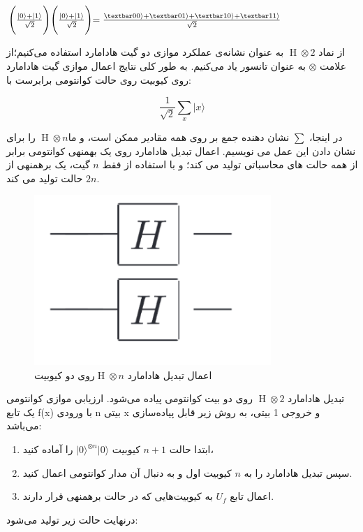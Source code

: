 \documentclass{book}
\begin{document}
\begin{center}
	$ \Biggl( \frac{\vert 0 \rangle + \vert 1 \rangle}{\sqrt{2}}\Biggl)\Biggl( \frac{\vert 0 \rangle + \vert 1 \rangle}{\sqrt{2}}\Biggl) = \frac{\textbar00\rangle + \textbar01\rangle + \textbar10\rangle + \textbar11\rangle}{\sqrt{2}}$

\end{center}

از نماد $\operatorname{H} \otimes 2$ به عنوان نشانه‌ی عملکرد موازی دو گیت هادامارد استفاده می‌کنیم؛از علامت $\otimes$ به عنوان تانسور یاد می‌کنیم. به طور کلی نتایج اعمال موازی گیت هادامارد روی  کیوبیت روی حالت کوانتومی برابرست با:

\begin{center}
	\[\frac{1}{\sqrt{2}} \sum_{x} \vert x \rangle\]
\end{center}


در اینجا، $\sum$ نشان دهنده جمع بر روی همه مقادیر ممکن  است، و ما$\operatorname{H} \otimes n$  را برای نشان دادن این عمل می نویسیم.
اعمال تبدیل هادامارد روی یک بهمنهی کوانتومی برابر از همه حالت های محاسباتی تولید می کند؛ و با استفاده از فقط $n$ گیت، یک برهمنهی از $2n$ حالت تولید می کند.
\begin{center}
	\begin{figure}[ht]
		\centering
		\includegraphics[width=0.8\textwidth]{Multyhadamard.png}
		\caption{اعمال تبدیل هادامارد $\operatorname{H} \otimes n$روی دو کیوبیت}
	\end{figure}
\end{center}

تبدیل هادامارد $\operatorname{H} \otimes 2$ روی دو بیت کوانتومی پیاده می‌شود. ارزیابی موازی کوانتومی یک تابع f(x) با ورودی n بیتی x و خروجی 1 بیتی، به روش زیر قابل پیاده‌سازی می‌باشد:

\begin{enumerate}
	\item ابتدا حالت $n + 1$ کیوبیت $\vert0\rangle^{\otimes n} \vert 0\rangle$ را آماده کنید،
	\item سپس تبدیل هادامارد را به $n$ کیوبیت اول و به دنبال آن مدار کوانتومی اعمال کنید.
	\item اعمال تابع $U_{f}$ به کیوبیت‌هایی که در حالت برهمنهی قرار دارند.
\end{enumerate}
درنهایت حالت زیر تولید ‌می‌شود:
\end{document}
